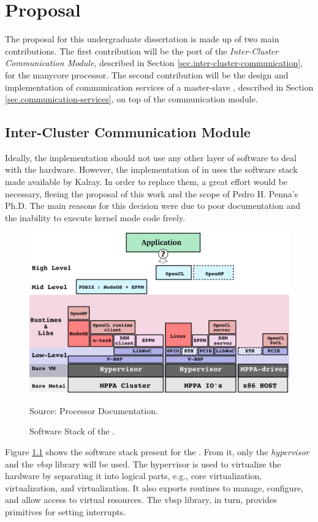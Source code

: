 \chapter{Proposal}
\label{ch.proposal}

The proposal for this undergraduate dissertation is made up of two main contributions.
The first contribution will be the port of the \textit{Inter-Cluster Communication Module},
described in Section \ref{sec.inter-cluster-communication}, for the \mppa manycore processor.
The second contribution will be the design and implementation of communication services
of a master-slave \os, described in Section \ref{sec.communication-services}, on top of
the communication module.

\section{Inter-Cluster Communication Module}

	Ideally, the \hal implementation should not use any other layer of software to
	deal with the hardware. However, the implementation of \hal in \mppa uses the
	software stack made available by Kalray.
	In order to replace them, a great effort would be necessary, fleeing the proposal
	of this work and the scope of Pedro H. Penna's Ph.D.
	The main reasons for this decision were due to poor documentation and the
	inability to execute kernel mode code freely.

	\begin{figure}[t]
		\centering
		\caption{Software Stack of the \mppa.}

		\includegraphics[width=.7\textwidth]{images/software-stack.png}

		Source: \mppa Processor Documentation.

		\label{fig.software-stack}
	\end{figure}

	Figure \ref{fig.software-stack} shows the software stack present for the \mppa.
	From it, only the \textit{hypervisor} and the \textit{vbsp} library will be used.
	The hypervisor is used to virtualize the hardware by separating it into logical
	parts, e.g., core virtualization, \cnoc virtualization, and \dnoc virtualization.
	It also exports routines to manage, configure, and allow access to virtual resources.
	The vbsp library, in turn, provides primitives for setting interrupts.

